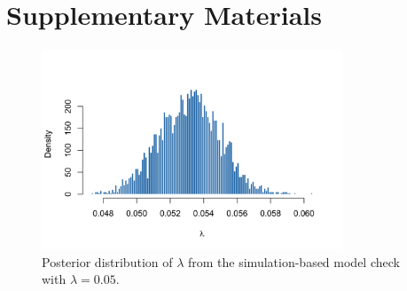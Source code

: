 \pagebreak
\section*{Supplementary Materials}


\setcounter{figure}{0}
\setcounter{table}{0}

\renewcommand{\thefigure}{S\arabic{figure}}
\renewcommand{\thetable}{S\arabic{table}}

\begin{figure}[H]
  \centering
  \includegraphics[width=0.8\textwidth]{images/simulation-based_model_check.png}
  \caption{{\small Posterior distribution of $\lambda$ from the simulation-based model check with $\lambda=0.05$.}}
  \label{fig:posterior_s1}
\end{figure}